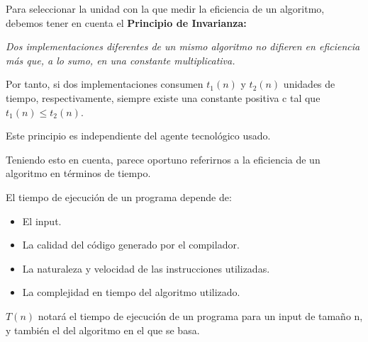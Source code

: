 \documentclass[11pt,a4paper]{article}
\begin{document}
\medskip

Para seleccionar la unidad con la que medir la eficiencia de un algoritmo, debemos tener en cuenta el \textbf{Principio de Invarianza:}

\medskip

\textit{Dos implementaciones diferentes de un mismo algoritmo no difieren en eficiencia más que, a lo sumo, en una constante multiplicativa.}

\medskip

Por tanto, si dos implementaciones consumen $t_1(n)$ y $t_2(n)$ unidades de tiempo, respectivamente, siempre existe una constante positiva c tal que $t_1(n) \leq t_2(n)$.

Este principio es independiente del agente tecnológico usado.

\medskip

Teniendo esto en cuenta, parece oportuno referirnos a la eficiencia de un algoritmo en términos de tiempo. 

El tiempo de ejecución de un programa depende de:

\begin{itemize}
\item El input.
\item La calidad del código generado por el compilador.
\item La naturaleza y velocidad de las instrucciones utilizadas.
\item La complejidad en tiempo del algoritmo utilizado.
\end{itemize}

$T(n)$ notará el tiempo de ejecución de un programa para un input de tamaño n, y también el del algoritmo en el que se basa.

\newpage
\end{document}
